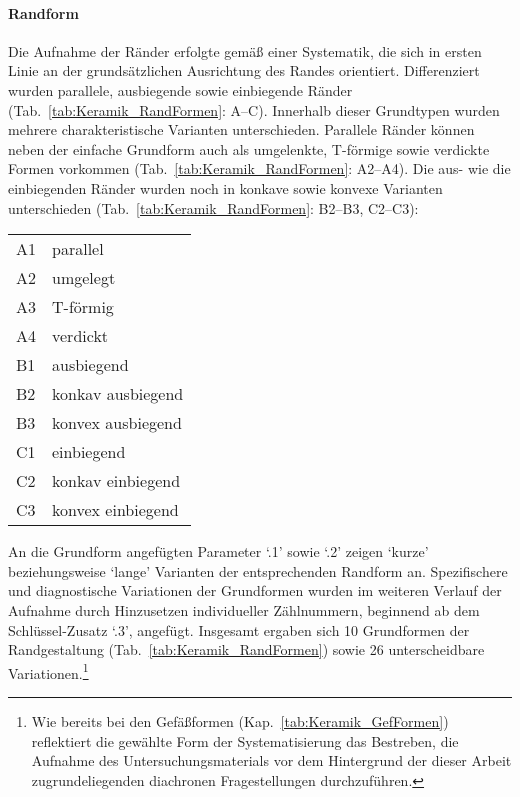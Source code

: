 \paragraph{Randform}\label{sec:Randform}
$\;$ \\
Die Aufnahme der Ränder erfolgte gemäß einer Systematik, die sich in ersten Linie an der grundsätzlichen Ausrichtung des Randes orientiert. Differenziert wurden parallele, ausbiegende sowie einbiegende Ränder (Tab.~\ref{tab:Keramik_RandFormen}: A--C). Innerhalb dieser Grundtypen wurden mehrere charakteristische Varianten unterschieden. Parallele Ränder können neben der einfache Grundform auch als umgelenkte, T-förmige sowie verdickte Formen vorkommen (Tab.~\ref{tab:Keramik_RandFormen}: A2--A4). Die aus- wie die einbiegenden Ränder wurden noch in konkave sowie konvexe Varianten unterschieden (Tab.~\ref{tab:Keramik_RandFormen}: B2--B3, C2--C3):

\vspace{1em}
\begin{tabular}{@{}ll@{}}
A1 & parallel \\
A2 & umgelegt \\
A3 & T-förmig \\
A4 & verdickt \\
B1 & ausbiegend \\
B2 & konkav ausbiegend \\
B3 & konvex ausbiegend \\
C1 & einbiegend \\
C2 & konkav einbiegend \\
C3 & konvex einbiegend \\
\end{tabular}
\addtocounter{table}{-1}
\vspace{1em}

\noindent An die Grundform angefügten Parameter \enquote*{.1} sowie \enquote*{.2} zeigen \enquote*{kurze} beziehungsweise \enquote*{lange} Varianten der entsprechenden Randform an. Spezifischere und diagnostische Variationen der Grundformen wurden im weiteren Verlauf der Aufnahme durch Hinzusetzen individueller Zählnummern, beginnend ab dem Schlüssel-Zusatz \enquote*{.3}, angefügt. Insgesamt ergaben sich 10 Grundformen der Randgestaltung (Tab.~\ref{tab:Keramik_RandFormen}) sowie 26 unterscheidbare Variationen.\footnote{Wie bereits bei den Gefäßformen (Kap.~\ref{tab:Keramik_GefFormen}) reflektiert die gewählte Form der Systematisierung das Bestreben, die Aufnahme des Untersuchungsmaterials vor dem Hintergrund der dieser Arbeit zugrundeliegenden diachronen Fragestellungen durchzuführen.}

